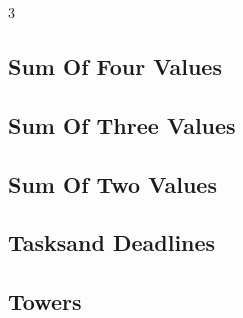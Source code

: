 \documentclass[8pt]{extarticle}
\begin{document}
\begin{multicols*}{3}
\subsection{Sum Of Four Values}
\begin{caixaenunciado}

\end{caixaenunciado}
\vspace{0.3cm}


\subsection{Sum Of Three Values}
\begin{caixaenunciado}

\end{caixaenunciado}
\vspace{0.3cm}


\subsection{Sum Of Two Values}
\begin{caixaenunciado}

\end{caixaenunciado}
\vspace{0.3cm}


\subsection{Tasksand Deadlines}
\begin{caixaenunciado}

\end{caixaenunciado}
\vspace{0.3cm}


\subsection{Towers}
\begin{caixaenunciado}

\end{caixaenunciado}
\vspace{0.3cm}



\end{multicols*}
\end{document}
